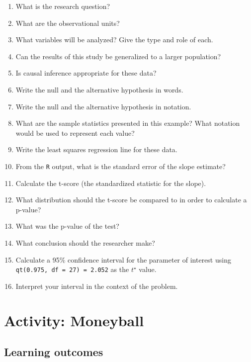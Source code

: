 \documentclass[
]{report}
\newcommand{\rgs}{\vspace{12pt}} %
\begin{document}
\begin{enumerate}
\def\labelenumi{\arabic{enumi}.}
\item
  What is the research question?
  \rgs
\item
  What are the observational units?
  \rgs
\item
  What variables will be analyzed? Give the type and role of each.
  \rgs
  \rgs
\item
  Can the results of this study be generalized to a larger population?
  \rgs
\item
  Is causal inference appropriate for these data?
  \rgs
\item
  Write the null and the alternative hypothesis in words.
  \rgs
  \rgs
\item
  Write the null and the alternative hypothesis in notation.
  \rgs
\item
  What are the sample statistics presented in this example? What notation would be used to represent each value?
  \rgs
\item
  Write the least squares regression line for these data.
  \rgs
\item
  From the \texttt{R} output, what is the standard error of the slope estimate?
  \rgs
\item
  Calculate the t-score (the standardized statistic for the slope).
  \rgs
\item
  What distribution should the t-score be compared to in order to calculate a p-value?
  \rgs
\item
  What was the p-value of the test?
  \rgs
\item
  What conclusion should the researcher make?
  \rgs
\item
  Calculate a 95\% confidence interval for the parameter of interest using \texttt{qt(0.975,\ df\ =\ 27)\ =\ 2.052} as the \(t^\star\) value.
  \rgs
\item
  Interpret your interval in the context of the problem.
  \rgs
  \rgs
\end{enumerate}

\newpage

\hypertarget{activity-moneyball}{%
\section{Activity: Moneyball}\label{activity-moneyball}}


\hypertarget{learning-outcomes-4}{%
\subsection{Learning outcomes}\label{learning-outcomes-4}}
\end{document}
